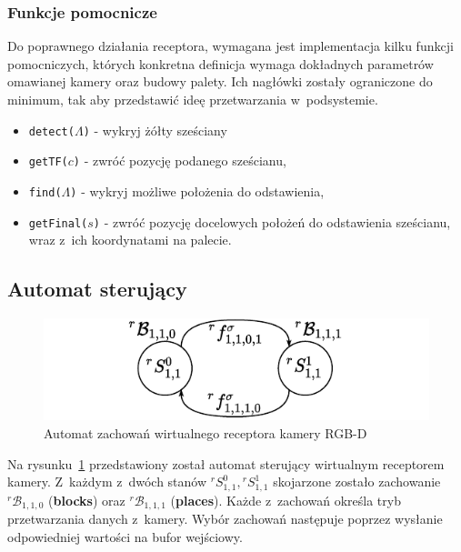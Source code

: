 \subsubsection{Funkcje pomocnicze}
Do poprawnego działania receptora, wymagana jest implementacja kilku funkcji pomocniczych, których konkretna definicja wymaga dokładnych parametrów omawianej kamery oraz budowy palety. Ich nagłówki zostały ograniczone do minimum, tak aby przedstawić ideę przetwarzania w~podsystemie.

\begin{itemize}
    \item \texttt{detect($\Lambda$)} - wykryj żółty sześciany
    \item \texttt{getTF($c$)} - zwróć pozycję podanego sześcianu,
    
    \item \texttt{find($\Lambda$)} - wykryj możliwe położenia do odstawienia,
    \item \texttt{getFinal($s$)} - zwróć pozycję docelowych położeń do odstawienia sześcianu, wraz z~ich koordynatami na palecie.
\end{itemize}

\subsection{Automat sterujący}
\begin{figure}[ht]
    \centering
    \includegraphics[width=\columnwidth]{figures/ISR-vr-camera-behaviours.pdf}
    \caption{Automat zachowań wirtualnego receptora kamery RGB-D}
    \label{fig:zachowania-vr-camera}
\end{figure}


Na rysunku~\ref{fig:zachowania-vr-camera} przedstawiony został automat sterujący wirtualnym receptorem kamery. Z~każdym z~dwóch stanów $ {}^{r}S_{1,1}^0,  {}^{r}S_{1,1}^1$ skojarzone zostało zachowanie ${}^{r}\mathcal{B}_{1,1,0}$ (\textbf{blocks}) oraz ${}^{r}\mathcal{B}_{1,1,1}$ (\textbf{places}). Każde z~zachowań określa tryb przetwarzania danych z~kamery. Wybór zachowań następuje poprzez wysłanie odpowiedniej wartości na bufor wejściowy.

